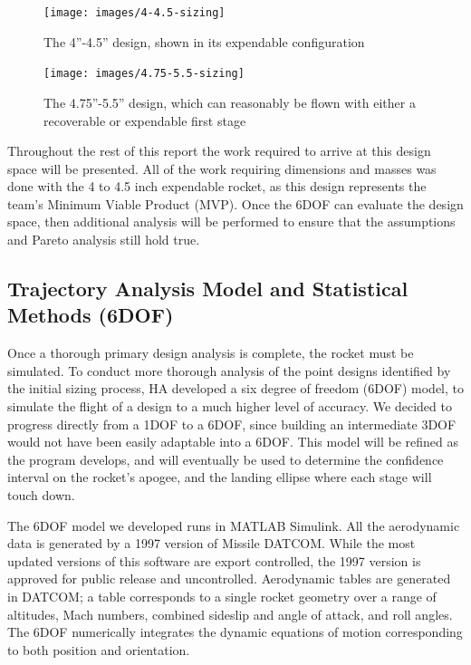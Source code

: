 \begin{figure}
    \centering
    \texttt{[image: images/4-4.5-sizing]}
    \caption{The 4''-4.5'' design, shown in its expendable configuration}
    \label{figure:smaller-point}
\end{figure}

\begin{figure}
    \centering
    \texttt{[image: images/4.75-5.5-sizing]}
    \caption{The 4.75''-5.5'' design, which can reasonably be flown with either a recoverable or expendable first stage}
    \label{figure:larger-point}
\end{figure}

Throughout the rest of this report the work required to arrive at this design space will be presented. All of the work requiring dimensions and masses was done with the 4 to 4.5 inch expendable rocket, as this design represents the team’s Minimum Viable Product (MVP). Once the 6DOF can evaluate the design space, then additional analysis will be performed to ensure that the assumptions and Pareto analysis still hold true.



\subsection{Trajectory Analysis Model and Statistical Methods (6DOF)} \label{section:6dof}

Once a thorough primary design analysis is complete, the rocket must be simulated.  To conduct more thorough analysis of the point designs identified by the initial sizing process, HA developed a six degree of freedom (6DOF) model, to simulate the flight of a design to a much higher level of accuracy. We decided to progress directly from a 1DOF to a 6DOF, since building an intermediate 3DOF would not have been easily adaptable into a 6DOF. This model will be refined as the program develops, and will eventually be used to determine the confidence interval on the rocket’s apogee, and the landing ellipse where each stage will touch down.

The 6DOF model we developed runs in MATLAB Simulink. All the aerodynamic data is generated by a 1997 version of Missile DATCOM. While the most updated versions of this software are export controlled, the 1997 version is approved for public release and uncontrolled. Aerodynamic tables are generated in DATCOM; a table corresponds to a single rocket geometry over a range of altitudes, Mach numbers, combined sideslip and  angle of attack, and roll angles. The 6DOF numerically integrates the dynamic equations of motion corresponding to both position and orientation.

